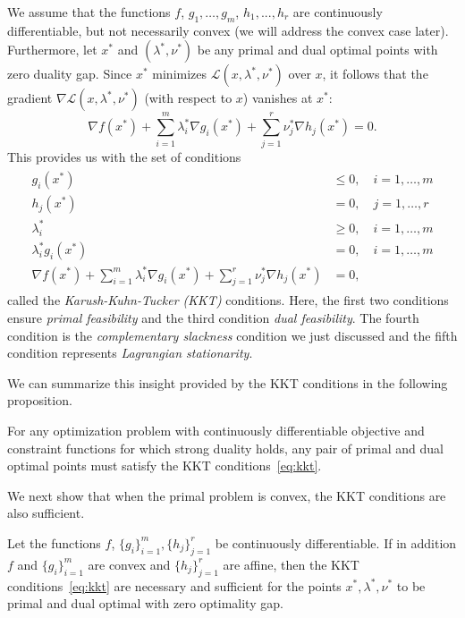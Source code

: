 \medskip
We assume that the functions $f$, $g_1,\dots,g_m$, $h_1, . . . , h_r$ are continuously differentiable, but not necessarily  convex (we will address the convex case later). Furthermore, let $x^*$ and $(\lambda^*, \nu^*)$ 
be any primal and dual optimal points with zero duality gap. Since $x^*$ minimizes $\mathcal{L}(x,\lambda^*,\nu^*)$ over $x$, it follows that the gradient  $\nabla \mathcal{L}(x,\lambda^*,\nu^*)$ (with respect to $x$) vanishes at $x^*$:
$$ \nabla f(x^*) + \sum_{i=1}^m \lambda^*_i \nabla g_i(x^*)
+ \sum_{j=1}^r \nu^*_j \nabla h_j(x^*) = 0.$$
This provides us with the set of conditions
\begin{align}\label{eq:kkt}
\begin{split}
g_i(x^*) & \le 0, \quad i=1,\dots,m  \\
h_j(x^*) & = 0, \quad j=1,\dots,r  \\
\lambda^{*}_i & \ge 0, \quad i=1,\dots,m \\
\lambda^{*}_i g_i(x^*) & = 0, \quad i=1,\dots,m  \\
\nabla f(x^*) + \sum_{i=1}^m \lambda^{*}_i \nabla g_i(x^*)  + \sum_{j=1}^r \nu^{*}_j \nabla h_j(x^*) & = 0, 
\end{split}
\end{align}
called the {\em Karush-Kuhn-Tucker (KKT)} conditions.
Here, the first two conditions ensure {\em primal feasibility} and the third condition {\em dual feasibility}. The fourth condition is the {\em complementary slackness} condition we just discussed and the fifth condition represents
{\em Lagrangian stationarity}.




We can summarize this insight provided by the KKT conditions in the following proposition.

\begin{proposition}\label{prop:kkt1}
For any optimization problem with continuously differentiable objective and constraint functions for which strong duality holds, any pair of primal and dual
optimal points must satisfy the KKT conditions~\eqref{eq:kkt}.
\end{proposition}




We next show that when the primal problem is convex, the KKT conditions are also sufficient.

\begin{theorem}\label{th:kkt2}
Let the functions $f$, $\{g_i\}_{i=1}^m, \{h_j\}_{j=1}^r$ be continuously differentiable. If in addition $f$ and $\{g_i\}_{i=1}^m$ are convex and $\{h_j\}_{j=1}^r$ are
affine, then the KKT conditions~\eqref{eq:kkt} are necessary and sufficient for the points $x^*, \lambda^*, \nu^*$ to be primal and dual optimal with zero optimality gap.
\end{theorem}

